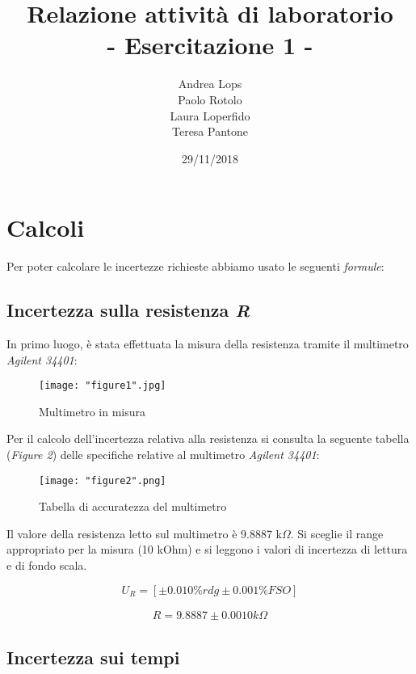 \documentclass[a4paper]{article}
\title{\textbf{Relazione attività di laboratorio}\\{\normalsize - Esercitazione 1 -}}
\author{Andrea Lops\\
		Paolo Rotolo\\
		Laura Loperfido\\
		Teresa Pantone
	   }
\date{29/11/2018}
\begin{document}
\maketitle

\section{Calcoli}

Per poter calcolare le incertezze richieste abbiamo usato le seguenti \emph{formule}:\\
\subsection {Incertezza sulla resistenza \emph{R}}

In primo luogo, è stata effettuata la misura della resistenza tramite il multimetro \emph{Agilent 34401}:

\begin{figure}[htp]
	\centering
	\texttt{[image: "figure1".jpg]}
	\caption{Multimetro in misura}
	\label{}
\end{figure}
\noindent 
Per il calcolo dell'incertezza relativa alla resistenza si consulta la seguente tabella (\emph{Figure 2}) delle specifiche relative al multimetro \emph{Agilent 34401}:
\begin{center}
	\begin{figure}[htp]
		\centering
		\texttt{[image: "figure2".png]}
		\caption{Tabella di accuratezza del multimetro}
		\label{a}
	\end{figure}
\end{center}

Il valore della resistenza letto sul multimetro è  9.8887 k$\Omega$. Si sceglie il range appropriato per la misura (10 kOhm) e si leggono i valori di incertezza di lettura e di fondo scala.

\begin{Large} 
	\begin{equation} 
		U_{R} = [\pm 0.010\%rdg \pm 0.001\% FSO]
	 \end{equation}
	 
	 \begin{eqnarray*} 
	 	R = 9.8887 \pm 0.0010 k\Omega 
	 \end{eqnarray*}
\end{Large}

\subsection {Incertezza sui tempi}
\end{document}
